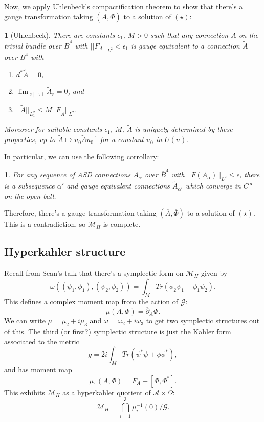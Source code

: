 \documentclass[oneside,english]{amsbook}
\numberwithin{section}{chapter}
\numberwithin{equation}{section}
\numberwithin{figure}{section}
\theoremstyle{plain}
\newtheorem{thm}{\protect\theoremname}
\theoremstyle{definition}
\theoremstyle{remark}
\theoremstyle{definition}
\theoremstyle{definition}
\theoremstyle{plain}
\newtheorem*{cor*}{\protect\corollaryname}
\providecommand{\corollaryname}{Corollary}
\providecommand{\theoremname}{Theorem}
\begin{document}
Now, we apply Uhlenbeck's compactification theorem to show that there's
a gauge transformation taking $\left(\overline{A},\overline{\Phi}\right)$
to a solution of $(\star)$:
\begin{thm}
[Uhlenbeck] There are constants $\epsilon_{1}$, $M>0$ such that
any connection $A$ on the trivial bundle over $\overline{B}^{4}$
with $||F_{A}||_{L^{2}}<\epsilon_{1}$ is gauge equivalent to a connection
$\tilde{A}$ over $B^{4}$ with
\begin{enumerate}
\item $d^{*}\tilde{A}=0$,
\item $\lim_{\left|x\right|\rightarrow1}\tilde{A}_{r}=0$, and
\item $||\tilde{A}||_{L_{1}^{2}}\leq M||F_{\tilde{A}}||_{L^{2}}$.
\end{enumerate}
Moreover for suitable constants $\epsilon_{1}$, $M$, $\tilde{A}$
is uniquely determined by these properties, up to $\tilde{A}\mapsto u_{0}\tilde{A}u_{0}^{-1}$
for a constant $u_{0}$ in $U\left(n\right)$.
\end{thm}
In particular, we can use the following corrollary:
\begin{cor*}
For any sequence of ASD connections $A_{\alpha}$ over $\overline{B}^{4}$
with $||F\left(A_{\alpha}\right)||_{L^{2}}\leq\epsilon$, there is
a subsequence $\alpha'$ and gauge equivalent connections $\tilde{A}_{\alpha'}$
which converge in $C^{\infty}$ on the open ball.
\end{cor*}
Therefore, there's a gauge transformation taking $\left(\overline{A},\overline{\Phi}\right)$
to a solution of $(\star)$. This is a contradiction, so $\mathcal{M}_{H}$
is complete.


\subsection{Hyperkahler structure}

Recall from Sean's talk that there's a symplectic form on $\mathcal{M}_{H}$
given by
\[
\omega\left((\psi_{1},\phi_{1}),\left(\psi_{2},\phi_{2}\right)\right)=\int_{M}Tr\left(\phi_{2}\psi_{1}-\phi_{1}\psi_{2}\right).
\]
This defines a complex moment map from the action of $\mathcal{G}$:
\[
\mu\left(A,\Phi\right)=\overline{\partial}_{A}\Phi.
\]
We can write $\mu=\mu_{2}+i\mu_{3}$ and $\omega=\omega_{2}+i\omega_{3}$
to get two symplectic structures out of this. The third (or first?)
symplectic structure is just the Kahler form associated to the metric
\[
g=2i\int_{M}Tr\left(\psi^{*}\psi+\phi\phi^{*}\right),
\]
and has moment map
\[
\mu_{1}\left(A,\Phi\right)=F_{A}+\left[\Phi,\Phi^{*}\right].
\]
This exhibits $\mathcal{M}_{H}$ as a hyperkahler quotient of $\mathcal{A}\times\Omega$:
\[
\mathcal{M}_{H}=\bigcap_{i=1}^{3}\mu_{i}^{-1}\left(0\right)/\mathcal{G}.
\]
\end{document}
